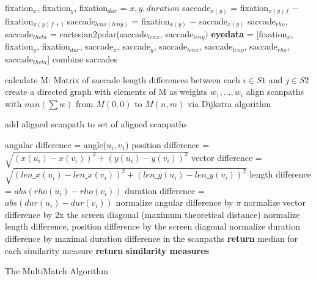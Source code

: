 \documentclass[a4paper, 12pt]{scrreprt}
\begin{document}
\begin{algorithm}[H]
	\begin{small}
	
	{ 
		{
			fixation$_x$, fixation$_y$, fixation$_{dur}$ = $x, y, duration$ \;
			saccade$_{x(y)}$ = fixation$_{x(y)}$$_{f}$ $-$ fixation$_{x(y)}$$_{f+1}$ \;
			saccade$_{lenx(leny)}$ = fixation$_{x(y)}$ $-$ saccade$_{x(y)}$\;
			saccade$_{rho}$, saccade$_{theta}$ = cartesian2polar(saccade$_{lenx}$, saccade$_{leny})$ \;
			\textbf{eyedata} = [fixation$_x$, fixation$_y$, fixation$_{dur}$, saccade$_x$, saccade$_y$, \newline saccade$_{lenx}$, saccade$_{leny}$, saccade$_{rho}$, saccade$_{theta}$]
		}
		{
			{
			{combine saccades}
			}
		}
	}
		{
			calculate M: Matrix of saccade length differences between each $i \in S1$ and  $j \in S2$\;
			create a directed graph with elements of M as weights $w_1, \ldots, w_i$\;
			align scanpaths with $min(\sum w)$ from $M(0,0)$ to $M(n,m)$ via Dijkstra algorithm\;
		
		add aligned scanpath to set of aligned scanpaths \;

		{
			angular difference = angle($u_i, v_1$)\;
			position difference = $\sqrt{(x(u_i) - x(v_i))^2 + (y(u_i) - y(v_i))^2}$ \;
			vector difference = $\sqrt{(len\_x(u_i) - len\_x(v_i))^2 + (len\_y(u_i) - len\_y(v_i))^2}$\;
			length difference = $abs(rho(u_i) - rho(v_i))$\;
			duration difference = $abs(dur(u_i)-dur(v_i))$ \;
		}
		normalize angular difference by $\pi$\;
		normalize vector difference by 2x the screen diagonal (maximum theoretical distance)\;
		normalize length difference, position difference by the screen diagonal\;
		normalize duration difference by maximal duration difference in the scanpaths\;
		\textbf{return} median for each similarity measure
	\textbf{return} \textbf{similarity measures}
}
	\caption{The MultiMatch Algorithm}
	\label{algo:multimatch}
\end{small}
\end{algorithm}
\end{document}
